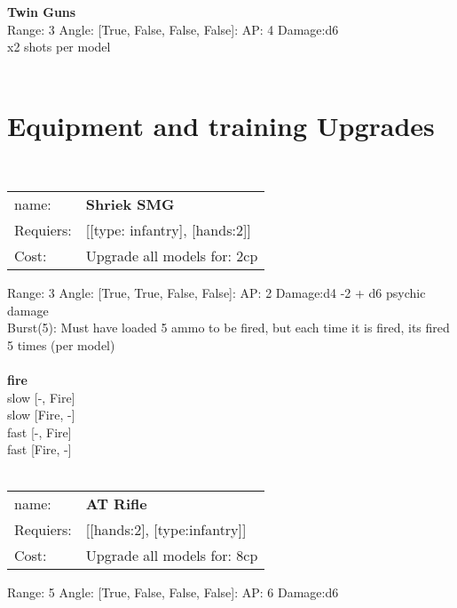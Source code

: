{\bf Twin Guns } \\



Range: 3  Angle: [True, False, False, False]: AP: 4 Damage:d6 \\
x2 shots per model\\ 




 
\ \\

\section{Equipment and training Upgrades}\ \\
\begin{tabular}{ll}
name: & {\bf Shriek SMG } \\
Requiers: & [[type: infantry], [hands:2]] \\
Cost: & Upgrade all models for: 2cp \\
\end{tabular}



Range: 3  Angle: [True, True, False, False]: AP: 2 Damage:d4 -2 + d6 psychic damage \\
Burst(5): Must have loaded 5 ammo to be fired, but each time it is fired, its fired 5 times (per model)\\ 







\ \\ {\bf fire } \\
slow [-, Fire] \\
slow [Fire, -] \\
fast [-, Fire] \\
fast [Fire, -] \\

\ \\
\begin{tabular}{ll}
name: & {\bf AT Rifle } \\
Requiers: & [[hands:2], [type:infantry]] \\
Cost: & Upgrade all models for: 8cp \\
\end{tabular}



Range: 5  Angle: [True, False, False, False]: AP: 6 Damage:d6 \\








